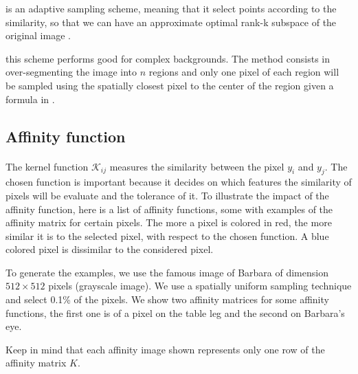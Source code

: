\begin{description}[align=left]
\begin{figure}[H]
  \end{figure}
 \item [Incremental sampling (INS)] is an adaptive sampling scheme, meaning that it select points according to the similarity, so that we can have an approximate optimal rank-k subspace of the original image \cite{zhan_improved_2017}.
 \item [Mean-shift segmentation-based sampling] this scheme performs good for complex backgrounds. The method consists in over-segmenting the image into \(n\) regions and only one pixel of each region will be sampled using the spatially closest pixel to the center of the region given a formula in \cite{kao_sampling_2012}.
\end{description}

\subsection{Affinity function}
\label{subsec:kernel-variations}

\paragraph{}
The kernel function \(\mathcal{K}_{ij}\) measures the similarity between the pixel \(y_i\) and \(y_j\).
The chosen function is important because it decides on which features the similarity of pixels will be evaluate and the tolerance of it.
To illustrate the impact of the affinity function, here is a list of affinity functions, some with examples of the affinity matrix for certain pixels.
The more a pixel is colored in red, the more similar it is to the selected pixel, with respect to the chosen function.
A blue colored pixel is dissimilar to the considered pixel.

To generate the examples, we use the famous image of Barbara of dimension \(512 \times 512\) pixels (grayscale image).
We use a spatially uniform sampling technique and select 0.1\% of the pixels.
We show two affinity matrices for some affinity functions, the first one is of a pixel on the table leg and the second on Barbara's eye.

Keep in mind that each affinity image shown represents only one row of the affinity matrix  \(K\).

